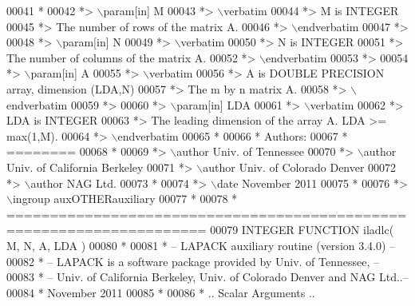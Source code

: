 \begin{DoxyCode}
00041 \textcolor{comment}{*}
00042 \textcolor{comment}{*> \(\backslash\)param[in] M}
00043 \textcolor{comment}{*> \(\backslash\)verbatim}
00044 \textcolor{comment}{*>          M is INTEGER}
00045 \textcolor{comment}{*>          The number of rows of the matrix A.}
00046 \textcolor{comment}{*> \(\backslash\)endverbatim}
00047 \textcolor{comment}{*>}
00048 \textcolor{comment}{*> \(\backslash\)param[in] N}
00049 \textcolor{comment}{*> \(\backslash\)verbatim}
00050 \textcolor{comment}{*>          N is INTEGER}
00051 \textcolor{comment}{*>          The number of columns of the matrix A.}
00052 \textcolor{comment}{*> \(\backslash\)endverbatim}
00053 \textcolor{comment}{*>}
00054 \textcolor{comment}{*> \(\backslash\)param[in] A}
00055 \textcolor{comment}{*> \(\backslash\)verbatim}
00056 \textcolor{comment}{*>          A is DOUBLE PRECISION array, dimension (LDA,N)}
00057 \textcolor{comment}{*>          The m by n matrix A.}
00058 \textcolor{comment}{*> \(\backslash\)endverbatim}
00059 \textcolor{comment}{*>}
00060 \textcolor{comment}{*> \(\backslash\)param[in] LDA}
00061 \textcolor{comment}{*> \(\backslash\)verbatim}
00062 \textcolor{comment}{*>          LDA is INTEGER}
00063 \textcolor{comment}{*>          The leading dimension of the array A. LDA >= max(1,M).}
00064 \textcolor{comment}{*> \(\backslash\)endverbatim}
00065 \textcolor{comment}{*}
00066 \textcolor{comment}{*  Authors:}
00067 \textcolor{comment}{*  ========}
00068 \textcolor{comment}{*}
00069 \textcolor{comment}{*> \(\backslash\)author Univ. of Tennessee }
00070 \textcolor{comment}{*> \(\backslash\)author Univ. of California Berkeley }
00071 \textcolor{comment}{*> \(\backslash\)author Univ. of Colorado Denver }
00072 \textcolor{comment}{*> \(\backslash\)author NAG Ltd. }
00073 \textcolor{comment}{*}
00074 \textcolor{comment}{*> \(\backslash\)date November 2011}
00075 \textcolor{comment}{*}
00076 \textcolor{comment}{*> \(\backslash\)ingroup auxOTHERauxiliary}
00077 \textcolor{comment}{*}
00078 \textcolor{comment}{*  =====================================================================}
00079 \textcolor{keyword}{      INTEGER }\textcolor{keyword}{FUNCTION }iladlc( M, N, A, LDA )
00080 \textcolor{comment}{*}
00081 \textcolor{comment}{*  -- LAPACK auxiliary routine (version 3.4.0) --}
00082 \textcolor{comment}{*  -- LAPACK is a software package provided by Univ. of Tennessee,    --}
00083 \textcolor{comment}{*  -- Univ. of California Berkeley, Univ. of Colorado Denver and NAG Ltd..--}
00084 \textcolor{comment}{*     November 2011}
00085 \textcolor{comment}{*}
00086 \textcolor{comment}{*     .. Scalar Arguments ..}

\end{DoxyCode}
